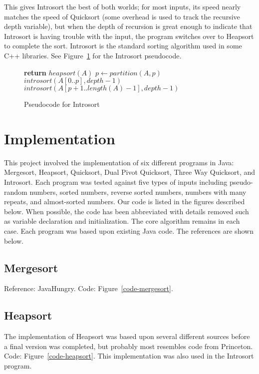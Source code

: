 \documentclass{article}
\begin{document}
This gives Introsort the best of both worlds; for most inputs, its speed nearly matches the
speed of Quicksort (some overhead is used to track the recursive depth variable), but when
the depth of recursion is great enough to indicate that Introsort is having trouble with the
input, the program switches over to Heapsort to complete the sort. Introsort is the standard
sorting algorithm used in some C++ libraries. See Figure~\ref{pseudo-introsort} for the 
Introsort pseudocode.

\begin{figure}
\begin{algorithmic}
			\State \textbf{return}
		\EndIf
			\State $heapsort(A)$
		\Else
			\State $p \gets partition(A,p)$
			\State $introsort(A[0..p], depth - 1)$
			\State $introsort(A[p+1..length(A) - 1], depth - 1)$
		\EndIf
	\EndProcedure
\end{algorithmic}
\caption{Pseudocode for Introsort}
\label{pseudo-introsort}
\end{figure}

\section{Implementation}
This project involved the implementation of six different programs in Java: Mergesort,
Heapsort, Quicksort, Dual Pivot Quicksort, Three Way Quicksort, and Introsort. Each
program was tested against five types of inputs including pseudo-random numbers,
sorted numbers, reverse sorted numbers, numbers with many repeats, and almost-sorted
numbers. Our code is listed in the figures described below. When possible, the code has
been abbreviated with details removed such as variable declaration and initialization. The
core algorithm remains in each case. Each program was based upon existing Java code.
The references are shown below.

\subsection{Mergesort}
Reference: JavaHungry\cite{JavaHungry}.
Code: Figure~\ref{code-mergesort}.

\subsection{Heapsort}
The implementation of Heapsort was based upon several different sources before a final
version was completed, but probably most resembles code from Princeton\cite{Princeton}.
Code: Figure~\ref{code-heapsort}. 
This implementation was also used in the Introsort program.
\end{document}
